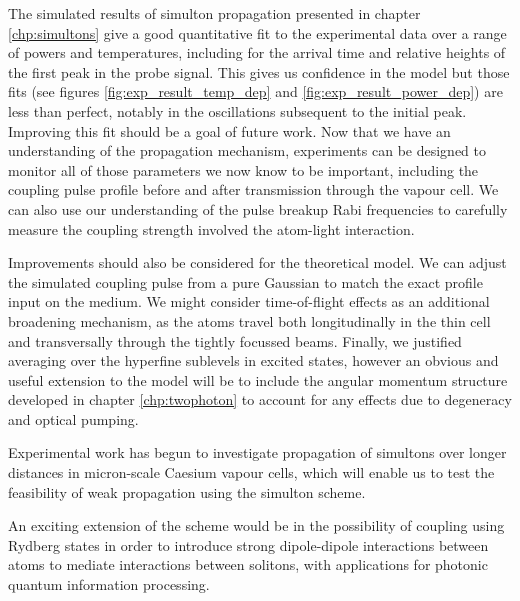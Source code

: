   The simulated results of simulton propagation presented in chapter
  \ref{chp:simultons} give a good quantitative fit to the experimental data over
  a range of powers and temperatures, including for the arrival time and
  relative heights of the first peak in the probe signal. This gives us
  confidence in the model but those fits (see figures
  \ref{fig:exp_result_temp_dep} and \ref{fig:exp_result_power_dep}) are less
  than perfect, notably in the oscillations subsequent to the initial peak.
  Improving this fit should be a goal of future work.  Now that we have an
  understanding of the propagation mechanism, experiments can be designed to
  monitor all of those parameters we now know to be important, including the
  coupling pulse profile before and after transmission through the vapour cell.
  We can also use our understanding of the pulse breakup Rabi frequencies to
  carefully measure the coupling strength involved the atom-light interaction.
  
  Improvements should also be considered for the theoretical model. We can
  adjust the simulated coupling pulse from a pure Gaussian to match the exact
  profile input on the medium. We might consider time-of-flight effects as an
  additional broadening mechanism, as the atoms travel both longitudinally in
  the thin cell and transversally through the tightly focussed beams. Finally,
  we justified averaging over the hyperfine sublevels in excited states, however
  an obvious and useful extension to the model will be to include the angular
  momentum structure developed in chapter \ref{chp:twophoton} to account for any
  effects due to degeneracy and optical pumping.

  Experimental work has begun to investigate propagation of simultons over
  longer distances in micron-scale Caesium vapour cells, which will enable us to
  test the feasibility of weak propagation using the simulton scheme. 

  An exciting extension of the scheme would be in the possibility of coupling
  using Rydberg states in order to introduce strong dipole-dipole interactions
  between atoms to mediate interactions between solitons, with applications for
  photonic quantum information
  processing.\cite{Maxwell2013,Maghrebi2015,Peyronel2012}
